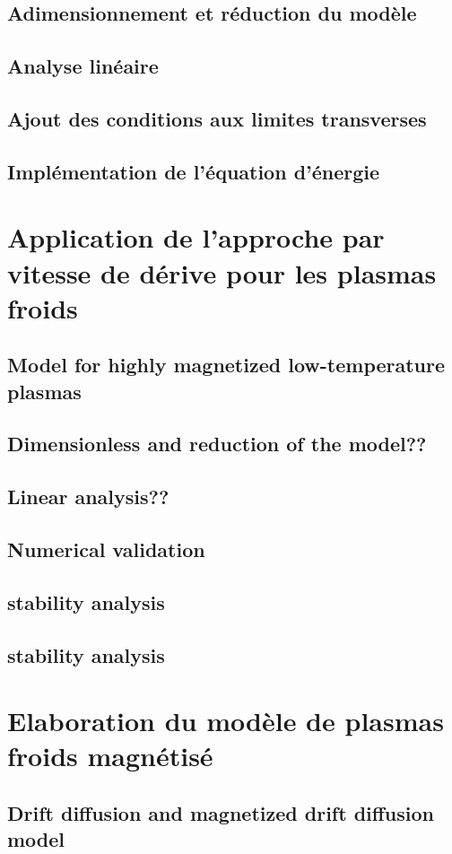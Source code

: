 		\subsection{Adimensionnement et réduction du modèle}
		\subsection{Analyse linéaire}
		\subsection{Ajout des conditions aux limites transverses}
		\subsection{Implémentation de l'équation d'énergie}
	\section{Application de l'approche par vitesse de dérive pour les plasmas froids}
		\subsection{Model for highly magnetized low-temperature plasmas}
		\subsection{Dimensionless and reduction of the model??}
		\subsection{Linear analysis??}
		\subsection{Numerical validation}
		\subsection{stability analysis}
		\subsection{stability analysis}
	\section{Elaboration du modèle de plasmas froids magnétisé}
		\subsection{Drift diffusion and magnetized drift diffusion model}
